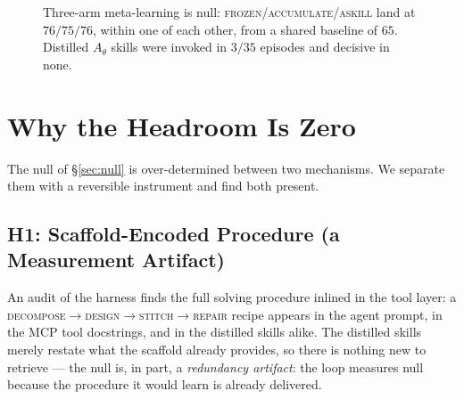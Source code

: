 \documentclass[11pt]{article}
\newcommand{\Ath}{A_{\theta}}
\begin{document}
\begin{figure}[t]\centering
{}
\caption{Three-arm meta-learning is null: \textsc{frozen}/\textsc{accumulate}/\textsc{askill} land at
$76/75/76$, within one of each other, from a shared baseline of $65$. Distilled $\Ath$ skills were
invoked in $3/35$ episodes and decisive in none.}
\label{fig:null}
\end{figure}

\section{Why the Headroom Is Zero}\label{sec:mech}
The null of \S\ref{sec:null} is over-determined between two mechanisms. We separate them with a
reversible instrument and find both present.

\subsection{H1: Scaffold-Encoded Procedure (a Measurement Artifact)}\label{sec:h1}
An audit of the harness finds the full solving procedure inlined in the tool layer: a
\textsc{decompose}$\to$\textsc{design}$\to$\textsc{stitch}$\to$\textsc{repair} recipe appears in the
agent prompt, in the MCP tool docstrings, and in the distilled skills alike. The distilled skills merely
restate what the scaffold already provides, so there is nothing new to retrieve --- the null is, in
part, a \emph{redundancy artifact}: the loop measures null because the procedure it would learn is
already delivered.
\end{document}
